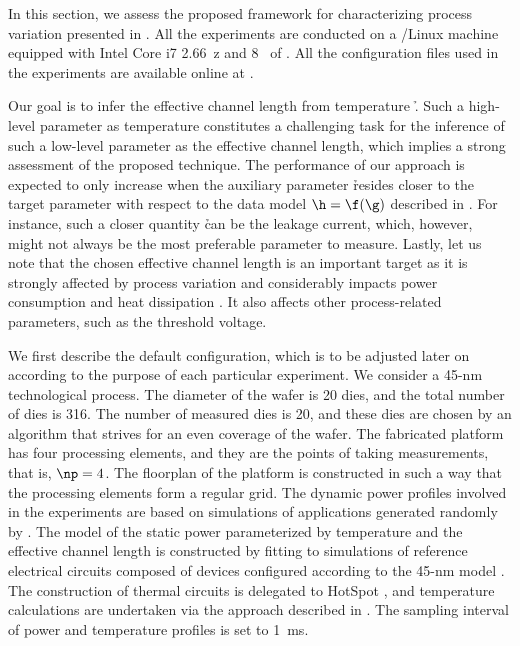 In this section, we assess the proposed framework for characterizing process
variation presented in . All the experiments are conducted
on a /Linux machine equipped with Intel Core i7 2.66~z and
8~ of . All the configuration files used in the experiments are
available online at \cite{eslab2014a}.

Our goal is to infer the effective channel length \g from temperature \h. Such a
high-level parameter as temperature constitutes a challenging task for the
inference of such a low-level parameter as the effective channel length, which
implies a strong assessment of the proposed technique. The performance of our
approach is expected to only increase when the auxiliary parameter \h resides
closer to the target parameter \g with respect to the data model $\h = \f(\g)$
described in . For instance, such a closer quantity \h
can be the leakage current, which, however, might not always be the most
preferable parameter to measure. Lastly, let us note that the chosen effective
channel length is an important target as it is strongly affected by process
variation and considerably impacts power consumption and heat dissipation
\cite{chandrakasan2000, srivastava2010, juan2011, juan2012}. It also affects
other process-related parameters, such as the threshold voltage.

We first describe the default configuration, which is to be adjusted later on
according to the purpose of each particular experiment. We consider a 45-nm
technological process. The diameter of the wafer is 20 dies, and the total
number of dies \nd is 316. The number of measured dies \hnd is 20, and these
dies are chosen by an algorithm that strives for an even coverage of the wafer.
The fabricated platform has four processing elements, and they are the points of
taking measurements, that is, $\np = 4$. The floorplan of the platform is
constructed in such a way that the processing elements form a regular grid. The
dynamic power profiles involved in the experiments are based on simulations of
applications generated randomly by  \cite{dick1998}. The model of the
static power parameterized by temperature and the effective channel length is
constructed by fitting to  simulations of reference electrical
circuits composed of  devices \cite{bsim} configured according to the
45-nm   model \cite{ptm}. The construction of thermal 
circuits is delegated to HotSpot \cite{skadron2003}, and temperature
calculations are undertaken via the approach described in
. The sampling interval of power and temperature
profiles is set to 1~ms.

